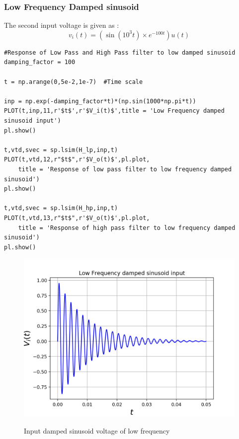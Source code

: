 \documentclass[11pt, a4paper]{article}
\begin{document}
\subsubsection{Low Frequency Damped sinusoid}
{
The second input voltage is given as :
\[v_i(t) = (\sin(10^3 t) \times e^{-100t})u(t)\]
}
\begin{verbatim}
#Response of Low Pass and High Pass filter to low damped sinusoid
damping_factor = 100

t = np.arange(0,5e-2,1e-7)  #Time scale

inp = np.exp(-damping_factor*t)*(np.sin(1000*np.pi*t))
PLOT(t,inp,11,r'$t$',r'$V_i(t)$',title = 'Low Frequency damped sinusoid input')
pl.show()

t,vtd,svec = sp.lsim(H_lp,inp,t)
PLOT(t,vtd,12,r"$t$",r'$V_o(t)$',pl.plot,
	title = 'Response of low pass filter to low frequency damped sinusoid')
pl.show()

t,vtd,svec = sp.lsim(H_hp,inp,t)
PLOT(t,vtd,13,r"$t$",r'$V_o(t)$',pl.plot,
	title = 'Response of high pass filter to low frequency damped sinusoid')
pl.show()

\end{verbatim}
\begin{figure}[H]
   	\centering
   	\includegraphics[scale=0.5]{vi_low.png}
   	\label{fig:vi_low}
   	\caption{Input damped sinusoid voltage of low frequency}
\end{figure}
\end{document}
